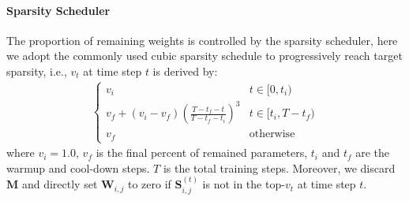 \paragraph{Sparsity Scheduler}
The proportion of remaining weights is controlled by the sparsity scheduler, here  we adopt the commonly used  cubic sparsity schedule to progressively reach target sparsity, i.e., $v_t$ at time step $t$ is derived by:
\begin{align}
	\begin{cases} 
		v_i & t\in [0, t_i) \\
		v_f+(v_i-v_f)(\frac{T-t_{f}-t}{T-t_f-t_i})^3 & t\in[t_i, T-t_f) \\
		v_f  & \text{otherwise}  
	\end{cases}
\end{align}
\label{eq:prune}
where $v_i=1.0$, $v_f$ is the final percent of remained parameters, $t_i$ and $t_f$ are the warmup and cool-down steps. $T$ is the total training steps. Moreover, we discard $\bm{M}$ and directly set $\bm{W}_{i,j}$ to zero if $\bm{S}_{i,j}^{(t)}$ is not in the top-$v_t$ at time step $t$. 
%


